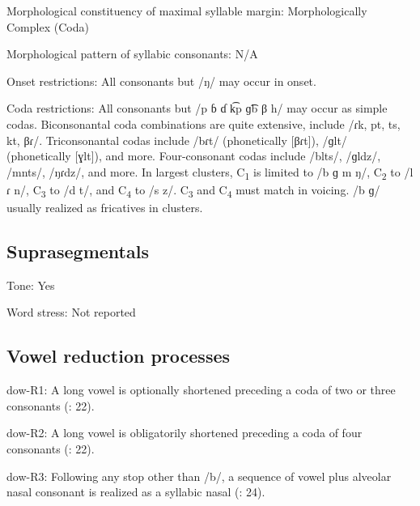 {\begin{appendixdesc}
\item[Morphological constituency of maximal syllable margin:] Morphologically Complex (Coda)

\item[Morphological pattern of syllabic consonants:] N/A

\item[Onset restrictions:] All consonants but /ŋ/ may occur in onset.

\item[Coda restrictions:] All consonants but /p ɓ ɗ k͡p ɡ͡b β h/ may occur as simple codas. Biconsonantal coda combinations are quite extensive, include /ɾk, pt, ts, kt, βɾ/. Triconsonantal codas include /bɾt/ (phonetically [βɾt]), /ɡlt/ (phonetically [ɣlt]), and more. Four-consonant codas include /blts/, /ɡldz/, /mnts/, /ŋɾdz/, and more. In largest clusters, C\textsubscript{1} is limited to /b ɡ m ŋ/, C\textsubscript{2} to /l ɾ n/, C\textsubscript{3} to /d t/, and C\textsubscript{4} to /s z/. C\textsubscript{3} and C\textsubscript{4} must match in voicing. /b ɡ/ usually realized as fricatives in clusters.
\end{appendixdesc}
\subsection*{Suprasegmentals}
\begin{appendixdesc}
\item[Tone:] Yes

\item[Word stress:] Not reported
\end{appendixdesc}
\subsection*{Vowel reduction processes}
\begin{appendixdesc}

\item[dow-R1:] A long vowel is optionally shortened preceding a coda of two or three consonants (\citealt{WieringWiering1994}: 22).

\item[dow-R2:] A long vowel is obligatorily shortened preceding a coda of four consonants (\citealt{WieringWiering1994}: 22).

\item[dow-R3:] Following any stop other than /b/, a sequence of vowel plus alveolar nasal consonant is realized as a syllabic nasal (\citealt{WieringWiering1994}: 24).
\end{appendixdesc}
}
